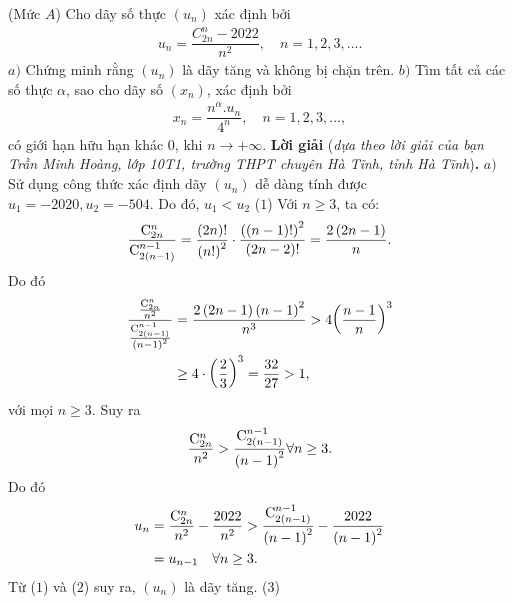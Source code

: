 \begin{multicols}{2}
	{}
	(Mức $A$) Cho dãy số thực $(u_n)$ xác định bởi 
	\begin{align*}
		u_n=\dfrac{C^n_{2n}-2022}{n^2},\quad n=1,2,3,\ldots.
	\end{align*}
	$a)$ Chứng minh rằng $(u_n)$ là dãy tăng và không bị chặn trên.
	\vskip 0.05cm
	$b)$ Tìm tất cả các số thực $\alpha$,  sao cho dãy số $(x_n)$, xác định bởi
	\begin{align*}
		x_n=\dfrac{n^\alpha. u_n}{4^n},\quad n=1,2,3,\ldots,
	\end{align*}
	có giới hạn hữu hạn khác $0$, khi $n\to+\infty$.
	\vskip 0.05cm
	\textbf{\color{thachthuctoanhoc}Lời giải} (\textit{dựa theo lời giải của bạn Trần Minh Hoàng, lớp 10T1, trường THPT chuyên Hà Tĩnh, tỉnh Hà Tĩnh})\textbf{\color{thachthuctoanhoc}.}
	\vskip 0.05cm
	$a)$ Sử dụng công thức xác định dãy  $(u_n)$ dễ dàng tính được $u_1 = -2020, u_2 = -504$.  Do đó, $u_1 < u_2$   \hfill ($1$)
	\vskip 0.05cm
	Với $n \ge  3$, ta có:
	\begin{align*}
		\frac{{{\rm{C}}_{2n}^n}}{{{\rm{C}}_{2\left( {n - 1} \right)}^{n - 1}}} = \frac{{\left( {2n} \right)!}}{{{{\left( {n!} \right)}^2}}} \cdot \frac{{{{\left( {\left( {n - 1} \right)!} \right)}^2}}}{{\left( {2n - 2} \right)!}} = \frac{{2\left( {2n - 1} \right)}}{n}.
	\end{align*}
	Do đó
	\begin{align*}
		\frac{{\frac{{{\rm{C}}_{2n}^n}}{{{n^2}}}}}{{\frac{{{\rm{C}}_{2\left( {n - 1} \right)}^{n - 1}}}{{{{\left( {n - 1} \right)}^2}}}}} &= \frac{{2\left( {2n - 1} \right){{\left( {n - 1} \right)}^2}}}{{{n^3}}} > 4{\left( {\frac{{n - 1}}{n}} \right)^3} \\
		&\ge 4 \cdot {\left( {\frac{2}{3}} \right)^3} = \frac{{32}}{{27}} > 1,
	\end{align*}
	với mọi $n \ge  3$. Suy ra
	\begin{align*}
		\frac{{{\rm{C}}_{2n}^n}}{{{n^2}}} > \frac{{{\rm{C}}_{2\left( {n - 1} \right)}^{n - 1}}}{{{{\left( {n - 1} \right)}^2}}}\forall n \ge 3.
	\end{align*}
	Do đó
	\begin{align*}
		{u_n} &= \frac{{{\rm{C}}_{2n}^n}}{{{n^2}}} - \frac{{2022}}{{{n^2}}} > \frac{{{\rm{C}}_{2\left( {n - 1} \right)}^{n - 1}}}{{{{\left( {n - 1} \right)}^2}}} - \frac{{2022}}{{{{\left( {n - 1} \right)}^2}}} \\
		&= {u_{n - 1}}\quad\forall n \ge 3.
	\end{align*}
	Từ ($1$) và ($2$) suy ra, $(u_n)$  là dãy tăng.                \hfill ($3$)

\end{multicols}
